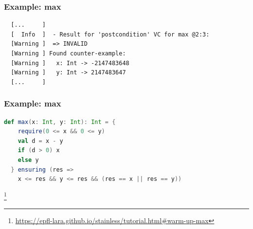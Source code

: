 \documentclass{beamer}
\newcommand\blfootnote[1]{%
  \begingroup
  \renewcommand\thefootnote{}\footnote{#1}%
  \addtocounter{footnote}{-1}%
  \endgroup
}
\begin{document}
\begin{frame}[fragile]
\frametitle{Example: max}
{\small\begin{verbatim}
  [...     ]
  [  Info  ]  - Result for 'postcondition' VC for max @2:3:
  [Warning ]  => INVALID
  [Warning ] Found counter-example:
  [Warning ]   x: Int -> -2147483648
  [Warning ]   y: Int -> 2147483647
  [...     ]
\end{verbatim}}

\end{frame}

\begin{frame}[fragile]
  \frametitle{Example: max}
  \begin{lstlisting}[language=Scala]
  def max(x: Int, y: Int): Int = {
    require(0 <= x && 0 <= y)
    val d = x - y
    if (d > 0) x
    else y
  } ensuring (res =>
    x <= res && y <= res && (res == x || res == y))
  \end{lstlisting}
  \blfootnote{\url{https://epfl-lara.github.io/stainless/tutorial.html\#warm-up-max}}
  \end{frame}
  
\end{document}
